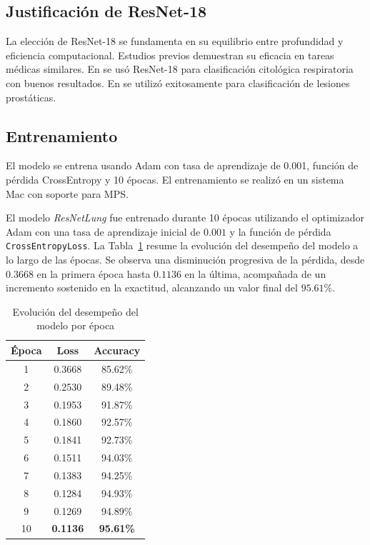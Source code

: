 \documentclass[conference]{IEEEtran}
\begin{document}
\subsection{Justificaci\'on de ResNet-18}
La elecci\'on de ResNet-18 se fundamenta en su equilibrio entre profundidad y eficiencia computacional. Estudios previos demuestran su eficacia en tareas m\'edicas similares. En \cite{xu2024resnet} se us\'o ResNet-18 para clasificaci\'on citol\'ogica respiratoria con buenos resultados. En \cite{wang2024pirads} se utiliz\'o exitosamente para clasificaci\'on de lesiones prost\'aticas.

\subsection{Entrenamiento}
El modelo se entrena usando Adam con tasa de aprendizaje de 0.001, funci\'on de p\'erdida CrossEntropy y 10 \'epocas. El entrenamiento se realiz\'o en un sistema Mac con soporte para MPS.

El modelo \textit{ResNetLung} fue entrenado durante 10 épocas utilizando el optimizador Adam con una tasa de aprendizaje inicial de $0.001$ y la función de pérdida \texttt{CrossEntropyLoss}. La Tabla~\ref{tab:epochacc} resume la evolución del desempeño del modelo a lo largo de las épocas. Se observa una disminución progresiva de la pérdida, desde $0.3668$ en la primera época hasta $0.1136$ en la última, acompañada de un incremento sostenido en la exactitud, alcanzando un valor final del $95.61\%$.

\begin{table}[ht]
\centering
\caption{Evolución del desempeño del modelo por época}
\begin{tabular}{|c|c|c|}
\hline
\textbf{Época} & \textbf{Loss} & \textbf{Accuracy} \\
\hline
1 & 0.3668 & 85.62\% \\
2 & 0.2530 & 89.48\% \\
3 & 0.1953 & 91.87\% \\
4 & 0.1860 & 92.57\% \\
5 & 0.1841 & 92.73\% \\
6 & 0.1511 & 94.03\% \\
7 & 0.1383 & 94.25\% \\
8 & 0.1284 & 94.93\% \\
9 & 0.1269 & 94.89\% \\
10 & \textbf{0.1136} & \textbf{95.61\%} \\
\hline
\end{tabular}
\label{tab:epochacc}
\end{table}
\end{document}
